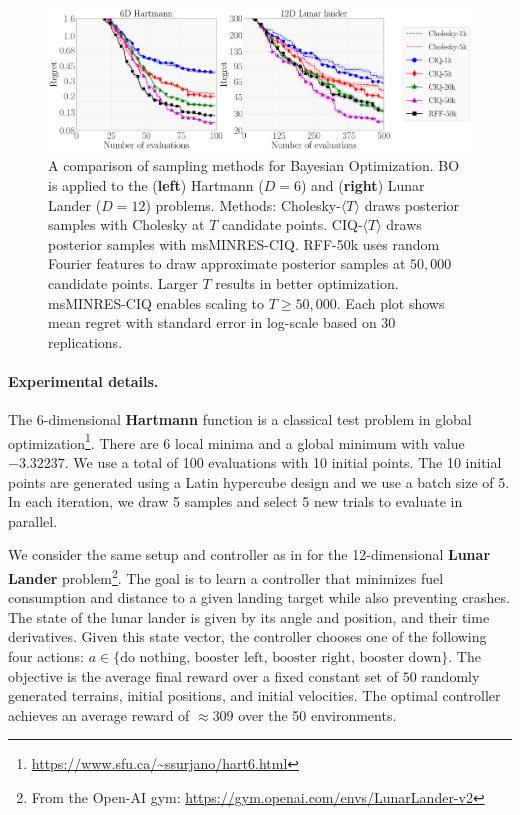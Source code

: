 \begin{figure}[t!]
  \centering
  \includegraphics[width=\linewidth]{figures/bo_ciq.pdf}
  \caption[
    A comparison of sampling methods for Bayesian optimization (BO) via TS.
    TS is applied to the Hartmann ($D=6$) and Lunar Lander ($D=12$).
  ]{
    A comparison of sampling methods for Bayesian Optimization.
    BO is applied to the ({\bf left}) Hartmann ($D=6$) and ({\bf right}) Lunar Lander ($D=12$) problems.
    Methods: Cholesky-$\langle T \rangle$ draws posterior samples with Cholesky at $T$ candidate points.
    CIQ-$\langle T \rangle$ draws posterior samples with msMINRES-CIQ.
    RFF-50k uses random Fourier features to draw approximate posterior samples at $50,\!000$ candidate points.
    Larger $T$ results in better optimization.
    msMINRES-CIQ enables scaling to $T \geq 50,\!000$.
    Each plot shows mean regret with standard error in log-scale based on 30 replications.
  }
  \label{fig:bayesopt}
\end{figure}

\paragraph{Experimental details.}
The 6-dimensional {\bf Hartmann} function is a classical test problem in global optimization\footnote{\url{https://www.sfu.ca/~ssurjano/hart6.html}}.
There are 6 local minima and a global minimum with value $-3.32237$.
We use a total of 100 evaluations with 10 initial points.
The 10 initial points are generated using a Latin hypercube design and we use a batch size of 5.
In each iteration, we draw 5 samples and select 5 new trials to evaluate in parallel.

We consider the same setup and controller as in \cite{eriksson2019scalable} for the 12-dimensional {\bf Lunar Lander} problem\footnote{
 From the Open-AI gym: \url{https://gym.openai.com/envs/LunarLander-v2}
}.
The goal is to learn a controller that minimizes fuel consumption and distance to a given landing target while also preventing crashes.
The state of the lunar lander is given by its angle and position, and their time derivatives.
Given this state vector, the controller chooses one of the following four actions: $a \in \{\text{do nothing, booster left, booster right, booster down}\}$.
The objective is the average final reward over a fixed constant set of $50$ randomly generated terrains, initial positions, and initial velocities.
The optimal controller achieves an average reward of $\approx 309$ over the 50 environments.

